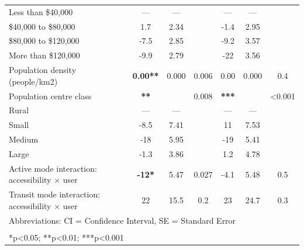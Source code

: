 \documentclass[preprint, 3p,
authoryear]{elsarticle} %
\begin{document}
\begin{table}
\begin{tabular}[t]{lcccccc}
\hspace{1em}Less than \$40,000 & — & — &  & — & — & \\
\hspace{1em}\$40,000 to \$80,000 & 1.7 & 2.34 &  & -1.4 & 2.95 & \\
\hspace{1em}\$80,000 to \$120,000 & -7.5 & 2.85 &  & -9.2 & 3.57 & \\
\hspace{1em}More than \$120,000 & -9.9 & 2.79 &  & -22 & 3.56 & \\
\addlinespace
Population density (people/km2) & \textbf{0.00**} & 0.000 & 0.006 & 0.00 & 0.000 & 0.4\\
Population centre class & \textbf{**} &  & 0.008 & \textbf{***} &  & <0.001\\
\hspace{1em}Rural & — & — &  & — & — & \\
\hspace{1em}Small & -8.5 & 7.41 &  & 11 & 7.53 & \\
\hspace{1em}Medium & -18 & 5.95 &  & -19 & 5.41 & \\
\addlinespace
\hspace{1em}Large & -1.3 & 3.86 &  & 1.2 & 4.78 & \\
Active mode interaction: accessibility × user & \textbf{-12*} & 5.47 & 0.027 & -4.1 & 5.48 & 0.5\\
Transit mode interaction: accessibility × user & 22 & 15.5 & 0.2 & 23 & 24.7 & 0.3\\
\bottomrule
\multicolumn{7}{l}{\rule{0pt}{1em}Abbreviations: CI = Confidence Interval, SE = Standard Error}\\
\multicolumn{7}{l}{\textsuperscript{} *p<0.05; **p<0.01; ***p<0.001}\\
\end{tabular}
\end{table}

\renewcommand\refname{References}

\end{document}
